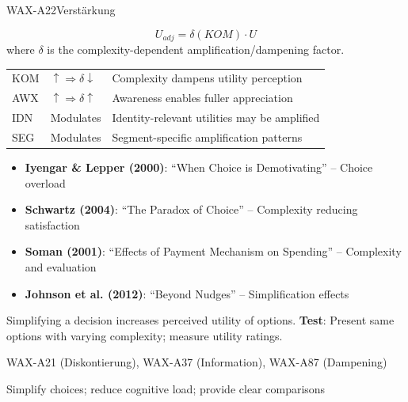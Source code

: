 \begin{axiomspec}{WAX-A22}{Verstärkung}

\begin{equation}
U_{adj} = \delta(KOM) \cdot U
\end{equation}
where $\delta$ is the complexity-dependent amplification/dampening factor.

\begin{tabular}{lll}
KOM & $\uparrow \Rightarrow \delta \downarrow$ & Complexity dampens utility perception \\
AWX & $\uparrow \Rightarrow \delta \uparrow$ & Awareness enables fuller appreciation \\
IDN & Modulates & Identity-relevant utilities may be amplified \\
SEG & Modulates & Segment-specific amplification patterns \\
\end{tabular}

\begin{itemize}
\item \textbf{Iyengar \& Lepper (2000)}: ``When Choice is Demotivating'' -- Choice overload
\item \textbf{Schwartz (2004)}: ``The Paradox of Choice'' -- Complexity reducing satisfaction
\item \textbf{Soman (2001)}: ``Effects of Payment Mechanism on Spending'' -- Complexity and evaluation
\item \textbf{Johnson et al. (2012)}: ``Beyond Nudges'' -- Simplification effects
\end{itemize}

Simplifying a decision increases perceived utility of options.
\textbf{Test}: Present same options with varying complexity; measure utility ratings.

WAX-A21 (Diskontierung), WAX-A37 (Information), WAX-A87 (Dampening)

Simplify choices; reduce cognitive load; provide clear comparisons

\end{axiomspec}


